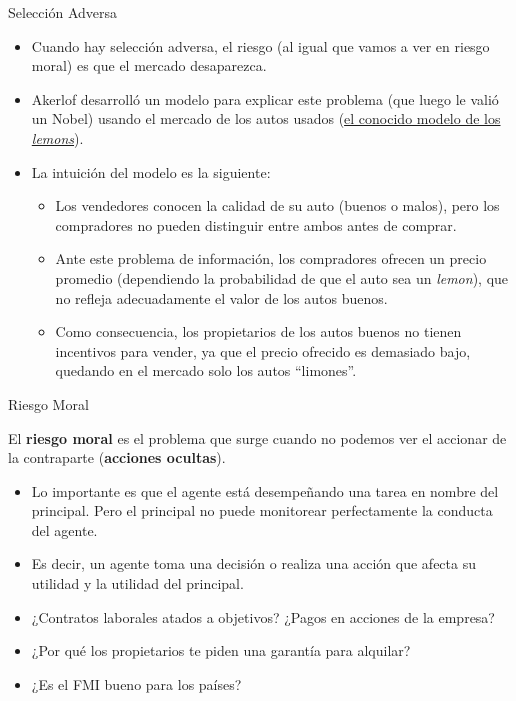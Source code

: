 \documentclass{beamer}
\begin{document}
\begin{frame}{Selección Adversa}
\label{volver}
    \begin{itemize}
        \item Cuando hay selección adversa, el riesgo (al igual que vamos a ver en riesgo moral) es que el mercado desaparezca.
        \vspace{1mm}
        \item Akerlof desarrolló un modelo para explicar este problema (que luego le valió un Nobel) usando el mercado de los autos usados (\hyperlink{hdos}{el conocido modelo de los \textit{lemons}}).
        \vspace{1mm}
        \item La intuición del modelo es la siguiente:
        \begin{itemize}
            \item Los vendedores conocen la calidad de su auto (buenos o malos), pero los compradores no pueden distinguir entre ambos antes de comprar.
            \item Ante este problema de información, los compradores ofrecen un precio promedio (dependiendo la probabilidad de que el auto sea un \textit{lemon}), que no refleja adecuadamente el valor de los autos buenos.
            \item Como consecuencia, los propietarios de los autos buenos no tienen incentivos para vender, ya que el precio ofrecido es demasiado bajo, quedando en el mercado solo los autos “limones”.
        \end{itemize}
    \end{itemize}
\end{frame}

\begin{frame}{Riesgo Moral}
    \begin{boxB}
        \centering
        El \textbf{riesgo moral} es el problema que surge cuando no podemos ver el accionar de la contraparte (\textbf{acciones ocultas}).
    \end{boxB}
    \begin{itemize}
        \item Lo importante es que el agente está desempeñando una tarea en nombre del principal. Pero el principal no puede monitorear perfectamente la conducta del agente.
        \item Es decir, un agente toma una decisión o realiza una acción que afecta su utilidad y la utilidad del principal.
        \item ¿Contratos laborales atados a objetivos? ¿Pagos en acciones de la empresa?
        \item ¿Por qué los propietarios te piden una garantía para alquilar?
        \item ¿Es el FMI bueno para los países?
    \end{itemize}
\end{frame}
\end{document}
